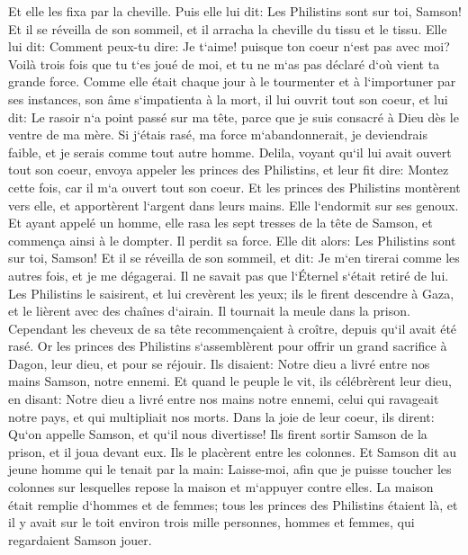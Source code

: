 \verse Et elle les fixa par la cheville. Puis elle lui dit: Les Philistins sont sur toi, Samson! Et il se réveilla de son sommeil, et il arracha la cheville du tissu et le tissu. 
\verse Elle lui dit: Comment peux-tu dire: Je t`aime! puisque ton coeur n`est pas avec moi? Voilà trois fois que tu t`es joué de moi, et tu ne m`as pas déclaré d`où vient ta grande force. 
\verse Comme elle était chaque jour à le tourmenter et à l`importuner par ses instances, son âme s`impatienta à la mort, 
\verse il lui ouvrit tout son coeur, et lui dit: Le rasoir n`a point passé sur ma tête, parce que je suis consacré à Dieu dès le ventre de ma mère. Si j`étais rasé, ma force m`abandonnerait, je deviendrais faible, et je serais comme tout autre homme. 
\verse Delila, voyant qu`il lui avait ouvert tout son coeur, envoya appeler les princes des Philistins, et leur fit dire: Montez cette fois, car il m`a ouvert tout son coeur. Et les princes des Philistins montèrent vers elle, et apportèrent l`argent dans leurs mains. 
\verse Elle l`endormit sur ses genoux. Et ayant appelé un homme, elle rasa les sept tresses de la tête de Samson, et commença ainsi à le dompter. Il perdit sa force. 
\verse Elle dit alors: Les Philistins sont sur toi, Samson! Et il se réveilla de son sommeil, et dit: Je m`en tirerai comme les autres fois, et je me dégagerai. Il ne savait pas que l`Éternel s`était retiré de lui. 
\verse Les Philistins le saisirent, et lui crevèrent les yeux; ils le firent descendre à Gaza, et le lièrent avec des chaînes d`airain. Il tournait la meule dans la prison. 
\verse Cependant les cheveux de sa tête recommençaient à croître, depuis qu`il avait été rasé. 
\verse Or les princes des Philistins s`assemblèrent pour offrir un grand sacrifice à Dagon, leur dieu, et pour se réjouir. Ils disaient: Notre dieu a livré entre nos mains Samson, notre ennemi. 
\verse Et quand le peuple le vit, ils célébrèrent leur dieu, en disant: Notre dieu a livré entre nos mains notre ennemi, celui qui ravageait notre pays, et qui multipliait nos morts. 
\verse Dans la joie de leur coeur, ils dirent: Qu`on appelle Samson, et qu`il nous divertisse! Ils firent sortir Samson de la prison, et il joua devant eux. Ils le placèrent entre les colonnes. 
\verse Et Samson dit au jeune homme qui le tenait par la main: Laisse-moi, afin que je puisse toucher les colonnes sur lesquelles repose la maison et m`appuyer contre elles. 
\verse La maison était remplie d`hommes et de femmes; tous les princes des Philistins étaient là, et il y avait sur le toit environ trois mille personnes, hommes et femmes, qui regardaient Samson jouer. 

